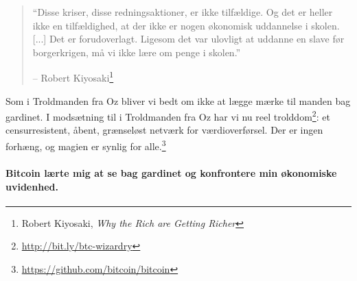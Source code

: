 \begin{quotation}\begin{samepage}
\enquote{Disse kriser, disse redningsaktioner, er ikke tilfældige. Og det er 
heller ikke en tilfældighed, at der ikke er nogen økonomisk uddannelse i skolen.
 [...] Det er forudoverlagt. Ligesom det var ulovligt at uddanne en slave før 
 borgerkrigen, må vi ikke lære om penge i skolen.}
\begin{flushright} -- Robert Kiyosaki\footnote{Robert Kiyosaki, 
    \textit{Why the Rich are Getting Richer}\cite{robert-kiyosaki}}
\end{flushright}\end{samepage}\end{quotation}

Som i Troldmanden fra Oz bliver vi bedt om ikke at lægge mærke til manden 
bag gardinet. I modsætning til i Troldmanden fra Oz har vi nu reel
trolddom\footnote{\url{http://bit.ly/btc-wizardry}}: et censurresistent, 
åbent, grænseløst netværk for værdioverførsel. Der er ingen forhæng, og 
magien er synlig for alle.\footnote{\url{https://github.com/bitcoin/bitcoin}}

\paragraph{Bitcoin lærte mig at se bag gardinet og konfrontere min økonomiske 
uvidenhed.}

%
%
%
%
